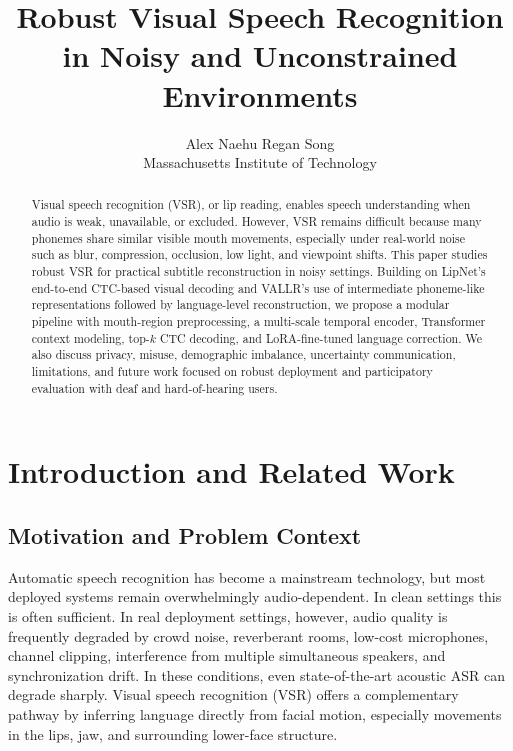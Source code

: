 \documentclass[10pt,twocolumn,letterpaper]{article}
\begin{document}
\title{Robust Visual Speech Recognition in Noisy and Unconstrained Environments}

\author{
Alex Naehu \qquad Regan Song\\
Massachusetts Institute of Technology
}

\maketitle

\begin{abstract}
Visual speech recognition (VSR), or lip reading, enables speech understanding when audio is weak, unavailable, or excluded. However, VSR remains difficult because many phonemes share similar visible mouth movements, especially under real-world noise such as blur, compression, occlusion, low light, and viewpoint shifts. This paper studies robust VSR for practical subtitle reconstruction in noisy settings. Building on LipNet’s end-to-end CTC-based visual decoding and VALLR’s use of intermediate phoneme-like representations followed by language-level reconstruction, we propose a modular pipeline with mouth-region preprocessing, a multi-scale temporal encoder, Transformer context modeling, top-$k$ CTC decoding, and LoRA-fine-tuned language correction. We also discuss privacy, misuse, demographic imbalance, uncertainty communication, limitations, and future work focused on robust deployment and participatory evaluation with deaf and hard-of-hearing users.
\end{abstract}

\section{Introduction and Related Work}
\subsection{Motivation and Problem Context}
Automatic speech recognition has become a mainstream technology, but most deployed systems remain overwhelmingly audio-dependent. In clean settings this is often sufficient. In real deployment settings, however, audio quality is frequently degraded by crowd noise, reverberant rooms, low-cost microphones, channel clipping, interference from multiple simultaneous speakers, and synchronization drift. In these conditions, even state-of-the-art acoustic ASR can degrade sharply. Visual speech recognition (VSR) offers a complementary pathway by inferring language directly from facial motion, especially movements in the lips, jaw, and surrounding lower-face structure.
\end{document}
